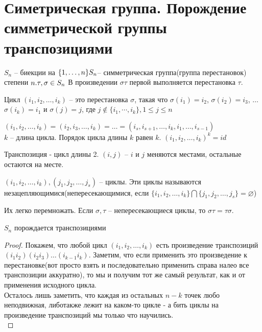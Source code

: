 \section{Симетрическая группа. Порождение симметрической группы транспозициями}


$S_n$ -- биекции на $\{1, \dotsc  , n\}\\ S_n $-- симметрическая группа(группа перестановок) степени $n.\\ \tau, \sigma \in S_n\\$ В произведении $\sigma\tau$ первой выполняется перестановка $\tau$.\\

\begin{Def}
	Цикл $(i_1, i_2, \dotsc, i_k)$ -- это перестановка $\sigma$, такая что 
	$\sigma(i_1) = i_2$, 
	$\sigma(i_2) = i_3$, 
	$\dotsc$\\
	$\sigma(i_k) = i_1$ 
	и $\sigma(j) = j$, где $j \notin \{i_1, \dotsb, i_k\}, 1 \le j \le n$
\end{Def}

$(i_1, i_2, \dotsc, i_k) = (i_2, i_3, \dotsc, i_k) = \dotsc = (i_s, i_{s+1}, \dotsc, i_k, i_1, \dotsc, i_{s - 1})$\\
$k$ -- длина цикла. Порядок цикла длины $k$ равен $k$.
$(i_1, i_2, \dotsc, i_k)^k = id$\\

\begin{Def}
	Транспозиция - цикл длины 2.
	$(i, j)$ -- $i$ и $j$ меняются местами, остальные остаются на месте.
\end{Def}

\begin{Def}
	$(i_1, i_2, \dotsc, i_k), (j_1, j_2, \dotsc, j_s)$ -- циклы. Эти циклы называются незацепляющимися(непересекающимися, если $\{i_1, i_2, \dotsc, i_k\} \bigcap \{j_1, j_2, \dotsc, j_s\} = \varnothing$)
\end{Def}

Их легко перемножать. Если $\sigma, \tau$ -- непересекающиеся циклы, то $\sigma\tau = \tau\sigma$.

\begin{theorem}{$S_n$ порождается транспозициями}
\end{theorem}
\begin{proof}
Покажем, что любой цикл $(i_1, i_2, \dotsc, i_k)$ есть произведение транспозиций $(i_1 i_2)(i_2 i_3)\dotsc(i_{k - 1}i_k)$. Заметим, что если применить это произведение к перестановке(вот просто взять и последовательно применить справа налео все транспозиции аккуратно), то мы и получим тот же самый результат, как и от применения исходного цикла.\\
Осталось лишь заметить, что каждая из остальных $n - k$ точек любо неподвижная, либотакже лежит на каком-то цикле - а бить циклы на произведение транспозиций мы только что научились.\\
\end{proof}